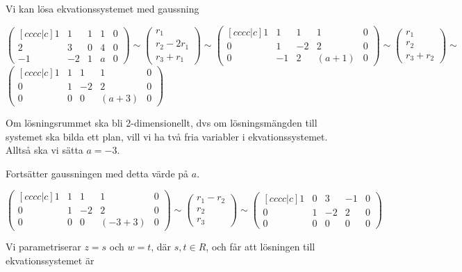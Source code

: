\documentclass[../../main.tex]{subfiles}
\begin{document}
\begin{solution}{15}

Vi kan lösa ekvationssystemet med gaussning

$$
\begin{pmatrix}[cccc|c]
1&1&1&1&0\\
2&3&0&4&0\\
-1&-2&1&a&0
\end{pmatrix}
\sim 
\begin{pmatrix}
r_1\\r_2 - 2r_1\\r_3 + r_1
\end{pmatrix}
\sim
\begin{pmatrix}[cccc|c]
1&1&1&1&0\\
0&1&-2&2&0\\
0&-1&2&(a+1)&0
\end{pmatrix}
\sim 
\begin{pmatrix}
r_1\\r_2\\r_3 + r_2
\end{pmatrix}
\sim
$$
$
\begin{pmatrix}[cccc|c]
1&1&1&1&0\\
0&1&-2&2&0\\
0&0&0&(a+3)&0
\end{pmatrix}
$

Om lösningsrummet ska bli 2-dimensionellt, dvs om lösningsmängden till systemet ska bilda ett plan, vill vi ha två fria variabler i ekvationssystemet. Alltså ska vi sätta $a = -3$.

Fortsätter gaussningen med detta värde på $a$.

$$
\begin{pmatrix}[cccc|c]
1&1&1&1&0\\
0&1&-2&2&0\\
0&0&0&(-3+3)&0
\end{pmatrix}
\sim 
\begin{pmatrix}
r_1 - r_2\\
r_2\\
r_3
\end{pmatrix}
\sim 
\begin{pmatrix}[cccc|c]
1&0&3&-1&0\\
0&1&-2&2&0\\
0&0&0&0&0
\end{pmatrix}
$$

Vi parametriserar $z = s$ och $w = t$, där $s, t \in R$, och får att lösningen till ekvationssystemet är


\end{solution}
\end{document}
